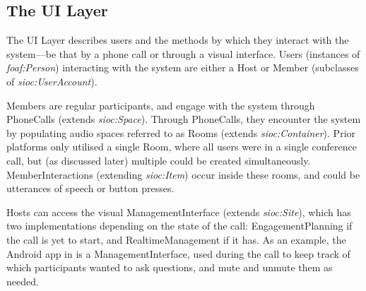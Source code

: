 \subsection{The UI Layer}

The UI Layer describes users and the methods by which they interact with the system---be that by a phone call or through a visual interface. Users (instances of \textit{foaf:Person}) interacting with the system are either a Host or Member (subclasses of \textit{sioc:UserAccount}). 

Members are regular participants, and engage with the system through PhoneCalls (extends \textit{sioc:Space}). Through PhoneCalls, they encounter the system by populating audio spaces referred to as Rooms (extends \textit{sioc:Container}). Prior platforms only utilised a single Room, where all users were in a single conference call, but (as discussed later) multiple could be created simultaneously. MemberInteractions (extending \textit{sioc:Item}) occur inside these rooms, and could be utterances of speech or button presses. 

Hosts can access the visual ManagementInterface (extends \textit{sioc:Site}), which has two implementations depending on the state of the call: EngagementPlanning if the call is yet to start, and RealtimeManagement if it has. As an example, the Android app in \cite{Kazakos2016} is a ManagementInterface, used during the call to keep track of which participants wanted to ask questions, and mute and unmute them as needed. 

